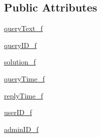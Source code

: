 \subsection*{Public Attributes}
\begin{DoxyCompactItemize}
\item 
\hyperlink{class_ecodena_1_1_query_1_1models_1_1_query_a9a5adf01c1dd10f1693e296f6b5d5266}{queryText\_\-f}
\item 
\hyperlink{class_ecodena_1_1_query_1_1models_1_1_query_aa0e07b4ca74e1e70f8687c8210fcda9b}{queryID\_\-f}
\item 
\hyperlink{class_ecodena_1_1_query_1_1models_1_1_query_a7d3a9e3880479a39865780b2c1180709}{solution\_\-f}
\item 
\hyperlink{class_ecodena_1_1_query_1_1models_1_1_query_af6bf78442af5d30068c5ae9b7f0c48f2}{queryTime\_\-f}
\item 
\hyperlink{class_ecodena_1_1_query_1_1models_1_1_query_a00674f59fb454935d65e31924d8a9df2}{replyTime\_\-f}
\item 
\hyperlink{class_ecodena_1_1_query_1_1models_1_1_query_a7aca73a76e3660ca990174870404f804}{userID\_\-f}
\item 
\hyperlink{class_ecodena_1_1_query_1_1models_1_1_query_a7899294640e6d869a1e4f2658666ada0}{adminID\_\-f}
\end{DoxyCompactItemize}
